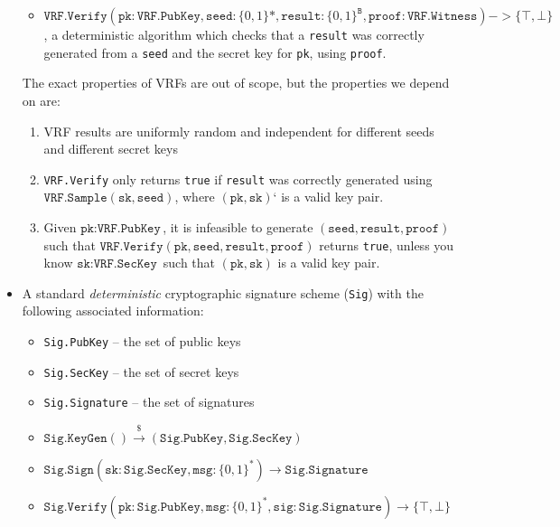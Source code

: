 \documentclass[11pt, oneside]{article}       %
\begin{document}
\begin{itemize}
\begin{itemize}
        \item \(\texttt{VRF.Verify}(\texttt{pk}: \texttt{VRF.PubKey},
            \texttt{seed}: {\{0,1\}}*, \texttt{result}: {\{0,1\}}^\texttt{B},
            \texttt{proof}: \texttt{VRF.Witness}) -> \{\top,\bot\}\), a
            deterministic algorithm which checks that a \texttt{result} was
            correctly generated from a \texttt{seed} and the secret key for
            \texttt{pk}, using \texttt{proof}.
    \end{itemize}

    The exact properties of VRFs are out of scope, but the properties we depend
    on are:
    \begin{enumerate}
        \item VRF results are uniformly random and independent for different
            seeds and different secret keys
        \item \texttt{VRF.Verify} only returns \texttt{true} if
            \texttt{result} was correctly generated
            using \(\texttt{VRF.Sample}(\texttt{sk},\texttt{seed})\), where
            \((\texttt{pk},\texttt{sk})\)` is a valid key pair.
        \item Given \(\texttt{pk}: \texttt{VRF.PubKey}\), it is infeasible to generate
            \((\texttt{seed},\texttt{result},\texttt{proof})\) such that
            \(\texttt{VRF.Verify}(\texttt{pk},\texttt{seed},\texttt{result},\texttt{proof})\)
            returns \texttt{true}, unless you know \(\texttt{sk}:
            \texttt{VRF.SecKey}\) such that \((\texttt{pk},\texttt{sk})\) is
            a valid key pair.
    \end{enumerate}

\item A standard \emph{deterministic} cryptographic signature scheme
    (\texttt{Sig}) with the following associated information:

    \begin{itemize}
        \item \texttt{Sig.PubKey} -- the set of public keys
        \item \texttt{Sig.SecKey} -- the set of secret keys
        \item \texttt{Sig.Signature} -- the set of signatures

        \item \(\texttt{Sig.KeyGen}() \xrightarrow{\$}
            (\texttt{Sig.PubKey},\texttt{Sig.SecKey})\)

        \item \(\texttt{Sig.Sign}(\texttt{sk}:
            \texttt{Sig.SecKey},\texttt{msg}: {\{0,1\}}^*) \to \texttt{Sig.Signature}\)
        \item \(\texttt{Sig.Verify}(\texttt{pk}:
            \texttt{Sig.PubKey},\texttt{msg}: {\{0,1\}}^*,\texttt{sig}:
            \texttt{Sig.Signature}) \to \{\top,\bot\}\)
    \end{itemize}


\end{itemize}
\end{document}
